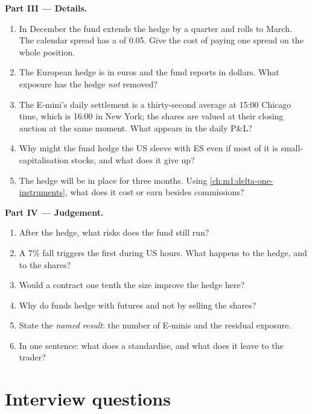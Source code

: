 \begin{problem}
\medskip\noindent\textbf{Part III --- Details.}
\begin{enumerate}[resume]
\item In December the fund extends the hedge by a quarter and rolls to
March. The calendar spread has a  of 0.05. Give the cost of paying one
spread  on the whole position.
\item The European hedge is in euros and the fund reports in dollars. What
exposure has the hedge \emph{not} removed?
\item The E-mini's daily settlement is a thirty-second average at 15:00
Chicago time, which is 16:00 in New York; the shares are valued at their
closing auction at the same moment. What appears in the daily P\&L?
\item Why might the fund hedge the US sleeve with ES even if most of it is
small-capitalisation stocks, and what does it give up?
\item The hedge will be in place for three months. Using
\cref{ch:m1:delta-one-instruments}, what does it cost or earn besides
commissions?
\end{enumerate}

\medskip\noindent\textbf{Part IV --- Judgement.}
\begin{enumerate}[resume]
\item After the hedge, what risks does the fund still run?
\item A 7\% fall triggers the first  during US hours. What happens
to the hedge, and to the shares?
\item Would a contract one tenth the size improve the hedge here?
\item Why do funds hedge with futures and not by selling the shares?
\item State the \emph{named result}: the number of E-minis and the residual
exposure.
\item In one sentence: what does a  standardise, and what
does it leave to the trader?
\end{enumerate}
\end{problem}

\section{Interview questions}

